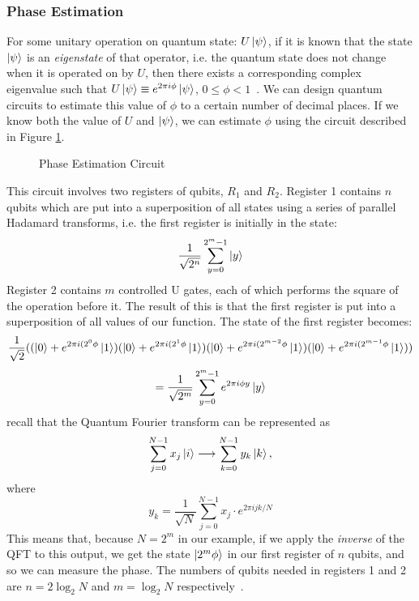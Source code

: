 \subsubsection{Phase Estimation}
For some unitary operation on quantum state: $U\ket{\psi}$, if it is known that the state $\ket{\psi}$ is an \emph{eigenstate} of that operator, i.e. the quantum state does not change when it is operated on by $U$, then there exists a corresponding complex eigenvalue such that $U\ket{\psi} \equiv e^{2\pi i\phi}\ket{\psi}$, $0 \leq \phi < 1$~\cite{nielsen2002quantum}. We can design quantum circuits to estimate this value of $\phi$ to a certain number of decimal places. If we know both the value of $U$ and $\ket{\psi}$, we can estimate $\phi$ using the circuit described in Figure \ref{fig:phaseEstimationCircuit}.
\begin{figure}[!htb]
\centering
\hspace{-2.5cm}
\resizebox{10cm}{!}{}
\caption{Phase Estimation Circuit~\cite{cleve1998quantum}}
\label{fig:phaseEstimationCircuit}
\end{figure}
This circuit involves two registers of qubits, $R_1$ and $R_2$. Register 1 contains $n$ qubits which are put into a superposition of all states using a series of parallel Hadamard transforms, i.e. the first register is initially in the state: $$\frac{1}{\sqrt{2^n}}\sum_{y=0}^{2^m-1}\ket{y}$$
Register 2 contains $m$ controlled U gates, each of which performs the square of the operation before it. The result of this is that the first register is put into a superposition of all values of our function. The state of the first register becomes: 
$$\frac{1}{\sqrt{2}}((\ket{0} + e^{2\pi i (2^{0} \phi} \ket{1})(\ket{0} + e^{2\pi i (2^{1} \phi} \ket{1})(\ket{0} + e^{2\pi i (2^{m-2} \phi} \ket{1})(\ket{0} + e^{2\pi i (2^{m-1} \phi} \ket{1}))$$
$$=\frac{1}{\sqrt{2^m}}\sum_{y=0}^{2^m-1}e^{2\pi i \phi y}\ket{y}$$
recall that the Quantum Fourier transform can be represented as 
$$\sum_{j=0}^{N-1}x_j\ket{i} \longrightarrow \sum_{k=0}^{N-1}y_k\ket{k},$$
where 
$$y_k = \frac{1}{\sqrt{N}}\sum_{j=0}^{N-1}x_j\cdot{e^{2\pi ijk/N}}$$
This means that, because $N = 2^m$ in our example, if we apply the \emph{inverse} of the QFT to this output, we get the state $\ket{2^m\phi}$ in our first register of $n$ qubits, and so we can measure the phase. The numbers of qubits needed in registers 1 and 2 are $n = 2\log_2 N$ and $m = \log_2 N$ respectively~\cite{kendon2004entanglement}.
